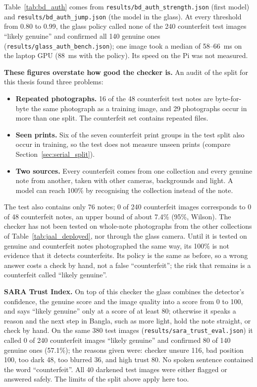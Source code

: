 Table~\ref{tab:bd_auth} comes from \texttt{results/bd\_auth\_strength.json} (first model) and \texttt{results/bd\_auth\_jump.json} (the model in the glass). At every threshold from 0.80 to 0.99, the glass policy called none of the 240 counterfeit test images ``likely genuine'' and confirmed all 140 genuine ones (\texttt{results/glass\_auth\_bench.json}); one image took a median of 58--66~ms on the laptop GPU (88~ms with the policy). Its speed on the Pi was not measured.

\textbf{These figures overstate how good the checker is.} An audit of the split for this thesis found three problems:
\begin{itemize}[noitemsep]
    \item \textbf{Repeated photographs.} 16 of the 48 counterfeit test notes are byte-for-byte the same photograph as a training image, and 29 photographs occur in more than one split. The counterfeit set contains repeated files.
    \item \textbf{Seen prints.} Six of the seven counterfeit print groups in the test split also occur in training, so the test does not measure unseen prints (compare Section~\ref{sec:serial_split}).
    \item \textbf{Two sources.} Every counterfeit comes from one collection and every genuine note from another, taken with other cameras, backgrounds and light. A model can reach 100\% by recognising the collection instead of the note.
\end{itemize}
The test also contains only 76 notes; 0 of 240 counterfeit images corresponds to 0 of 48 counterfeit notes, an upper bound of about 7.4\% (95\%, Wilson). The checker has not been tested on whole-note photographs from the other collections of Table~\ref{tab:jaal_deployed}, nor through the glass camera. Until it is tested on genuine and counterfeit notes photographed the same way, its 100\% is not evidence that it detects counterfeits. Its policy is the same as before, so a wrong answer costs a check by hand, not a false ``counterfeit''; the risk that remains is a counterfeit called ``likely genuine''.

\textbf{SARA Trust Index.} On top of this checker the glass combines the detector's confidence, the genuine score and the image quality into a score from 0 to 100, and says ``likely genuine'' only at a score of at least 80; otherwise it speaks a reason and the next step in Bangla, such as more light, hold the note straight, or check by hand. On the same 380 test images (\texttt{results/sara\_trust\_eval.json}) it called 0 of 240 counterfeit images ``likely genuine'' and confirmed 80 of 140 genuine ones (57.1\%); the reasons given were: checker unsure 116, bad position 100, too dark 48, too blurred 36, and high trust 80. No spoken sentence contained the word ``counterfeit''. All 40 darkened test images were either flagged or answered safely. The limits of the split above apply here too.

